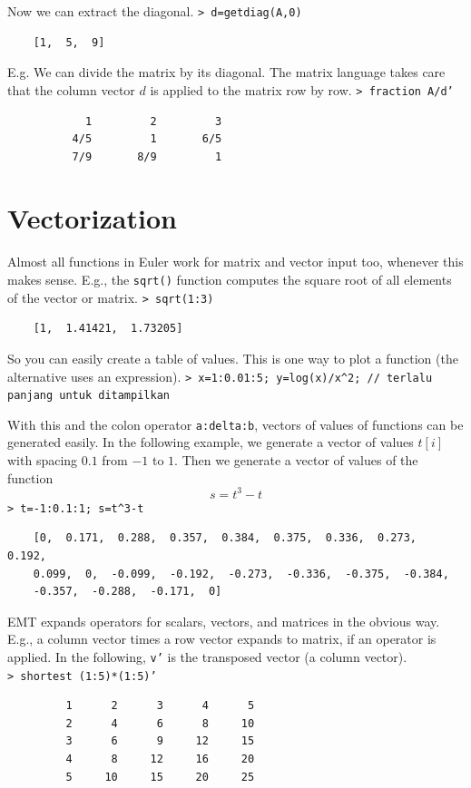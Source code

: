 \documentclass[11pt, a4paper]{article}
\newcommand{\emtcmd}[1]{\noindent\texttt{\textcolor{emtcommand}{>}\ #1}\par\smallskip}
\begin{document}
Now we can extract the diagonal.
\emtcmd{d=getdiag(A,0)}
\begin{verbatim}
    [1,  5,  9]
\end{verbatim}

E.g. We can divide the matrix by its diagonal. The matrix language takes care that the column vector $d$ is applied to the matrix row by row.
\emtcmd{fraction A/d'}
\begin{verbatim}
            1         2         3
          4/5         1       6/5
          7/9       8/9         1
\end{verbatim}

\section*{Vectorization}

Almost all functions in Euler work for matrix and vector input too, whenever this makes sense. E.g., the \texttt{sqrt()} function computes the square root of all elements of the vector or matrix.
\emtcmd{sqrt(1:3)}
\begin{verbatim}
    [1,  1.41421,  1.73205]
\end{verbatim}

So you can easily create a table of values. This is one way to plot a function (the alternative uses an expression).
\emtcmd{x=1:0.01:5; y=log(x)/x\^{}2; \textcolor{emtcomment}{// terlalu panjang untuk ditampilkan}}

With this and the colon operator \texttt{a:delta:b}, vectors of values of functions can be generated easily. In the following example, we generate a vector of values $t[i]$ with spacing $0.1$ from $-1$ to $1$. Then we generate a vector of values of the function
$$s = t^3-t$$
\emtcmd{t=-1:0.1:1; s=t\^{}3-t}
\begin{verbatim}
    [0,  0.171,  0.288,  0.357,  0.384,  0.375,  0.336,  0.273,  0.192,
    0.099,  0,  -0.099,  -0.192,  -0.273,  -0.336,  -0.375,  -0.384,
    -0.357,  -0.288,  -0.171,  0]
\end{verbatim}

EMT expands operators for scalars, vectors, and matrices in the obvious way. E.g., a column vector times a row vector expands to matrix, if an operator is applied. In the following, \texttt{v'} is the transposed vector (a column vector).
\emtcmd{shortest (1:5)*(1:5)'}
\begin{verbatim}
         1      2      3      4      5
         2      4      6      8     10
         3      6      9     12     15
         4      8     12     16     20
         5     10     15     20     25
\end{verbatim}
\end{document}

